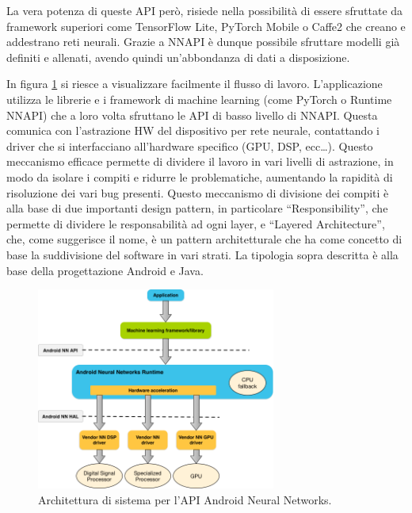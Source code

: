 La vera potenza di queste API però, risiede nella possibilità di essere sfruttate da framework superiori come TensorFlow Lite, PyTorch Mobile o Caffe2 che
creano e addestrano reti neurali. Grazie a NNAPI è dunque possibile sfruttare modelli già definiti e allenati, avendo quindi un’abbondanza di dati a
disposizione.

In figura \ref{fig:nnapiArchitecture} si riesce a visualizzare facilmente il flusso di lavoro. L’applicazione utilizza le librerie e i framework di machine
learning (come PyTorch o Runtime NNAPI) che a loro volta sfruttano le API di basso livello di NNAPI.
Questa comunica con l’astrazione HW del dispositivo per rete neurale, contattando i driver che si interfacciano all’hardware specifico (GPU, DSP, ecc\dots).
Questo meccanismo efficace permette di dividere il lavoro in vari livelli di astrazione, in modo da isolare i compiti e ridurre le problematiche, aumentando
la rapidità di risoluzione dei vari bug presenti. Questo meccanismo di divisione dei compiti è alla base di due importanti design pattern, in particolare
“Responsibility”, che permette di dividere le responsabilità ad ogni layer, e “Layered Architecture”, che, come suggerisce il nome, è un pattern architetturale
che ha come concetto di base la suddivisione del software in vari strati. La tipologia sopra descritta è alla base della progettazione Android e Java.

\begin{figure}[ht]
    \centering
    \includegraphics[width=0.7\textwidth]{Immagini/nnapi_architecture.png}
    \caption{Architettura di sistema per l'API Android Neural Networks.}
    \label{fig:nnapiArchitecture}
\end{figure}


